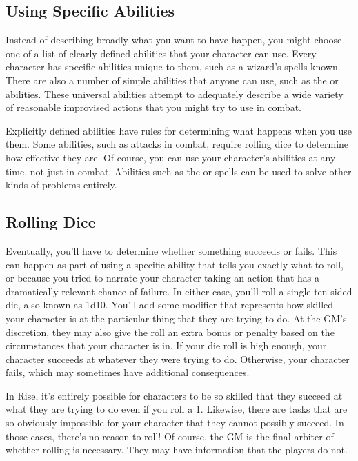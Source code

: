   \subsection{Using Specific Abilities}
    Instead of describing broadly what you want to have happen, you might choose one of a list of clearly defined abilities that your character can use.
    Every character has specific abilities unique to them, such as a wizard's spells known.
    There are also a number of simple abilities that anyone can use, such as the  or  abilities.
    These universal abilities attempt to adequately describe a wide variety of reasonable improvised actions that you might try to use in combat.

    Explicitly defined abilities have rules for determining what happens when you use them.
    Some abilities, such as attacks in combat, require rolling dice to determine how effective they are.
    Of course, you can use your character's abilities at any time, not just in combat.
    Abilities such as the  or  spells can be used to solve other kinds of problems entirely.

  \subsection{Rolling Dice}
    Eventually, you'll have to determine whether something succeeds or fails.
    This can happen as part of using a specific ability that tells you exactly what to roll, or because you tried to narrate your character taking an action that has a dramatically relevant chance of failure.
    In either case, you'll roll a single ten-sided die, also known as 1d10.
    You'll add some modifier that represents how skilled your character is at the particular thing that they are trying to do.
    At the GM's discretion, they may also give the roll an extra bonus or penalty based on the circumstances that your character is in.
    If your die roll is high enough, your character succeeds at whatever they were trying to do.
    Otherwise, your character fails, which may sometimes have additional consequences.

    In Rise, it's entirely possible for characters to be so skilled that they succeed at what they are trying to do even if you roll a 1.
    Likewise, there are tasks that are so obviously impossible for your character that they cannot possibly succeed.
    In those cases, there's no reason to roll!
    Of course, the GM is the final arbiter of whether rolling is necessary.
    They may have information that the players do not.

